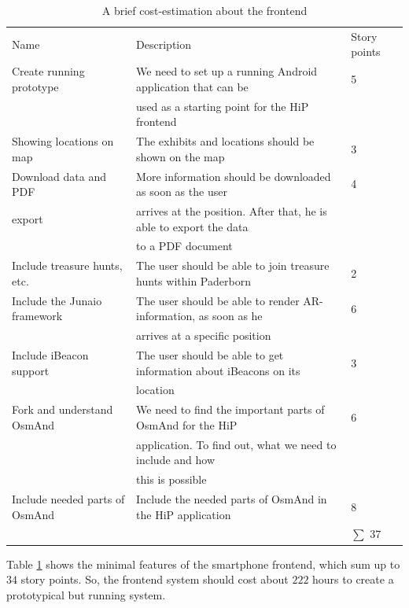  \begin{table}[th]
\scriptsize
 \caption{A brief cost-estimation about the frontend}
 \begin{tabular}{lll}
	\toprule
  	Name & Description & Story points \\ 
	\cmidrule(rl){1-1}\cmidrule(rl){2-2}\cmidrule(rl){3-3}
	Create running prototype		&	We need to set up a running Android application that can be			&	5 \\	
							& 	 used as a starting point for the \ac{HiP} frontend					& 	\\
	Showing locations on map	&	The exhibits and locations should be shown on the map			&	3 \\	
	Download data and PDF	 	&	More information should be downloaded as soon as the user		&	4 \\	
	export					& 	arrives at the position. After that, he is able to export the data		&	\\
							& 	to a \ac{PDF} document										& 	\\
	Include treasure hunts, etc.	&	The user should be able to join treasure hunts within Paderborn		&	2 \\	
	Include the Junaio framework	&	The user should be able to render AR-information, as soon as he		&	6 \\			
							&	arrives at a specific position									&	\\
	Include iBeacon support		&	The user should be able to get information about iBeacons on its		&	3 \\			
							&	location													&	\\
	Fork and understand \ac{OsmAnd}	&	We need to find the important parts of \ac{OsmAnd} for the \ac{HiP}	&	6 \\
							&	application. To find out, what we need to include and how 			&	\\
							&	this is possible												& \\
	Include needed parts of \ac{OsmAnd}	&	Include the needed parts of \ac{OsmAnd} in the \ac{HiP} application	&	8 \\	
					  	 	& 												& $\sum$ $37$   \\			
	\bottomrule
 \end{tabular}
 \label{tab:costFrontend}
 \end{table} 

Table \ref{tab:costFrontend} shows the minimal features of the smartphone frontend, which sum up to $34$ story points. So, the frontend system should cost about $222$ hours to create a prototypical but running system. 
